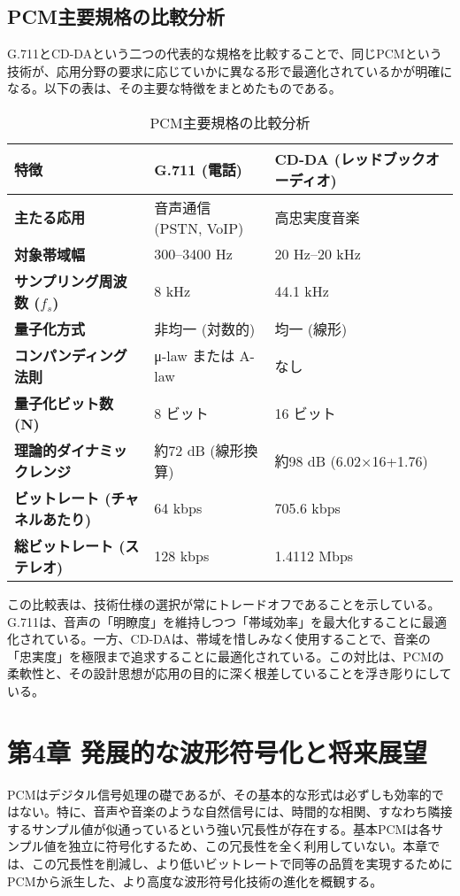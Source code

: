 \documentclass[
  a4paper,  %
  11pt,     %
]{ltjsarticle}%
\begin{document}
\subsection{PCM主要規格の比較分析}

G.711とCD-DAという二つの代表的な規格を比較することで、同じPCMという技術が、応用分野の要求に応じていかに異なる形で最適化されているかが明確になる。以下の表は、その主要な特徴をまとめたものである。

\begin{table}[H]
  \centering
  \caption{PCM主要規格の比較分析}
  \begin{tabular}{lll}
    \toprule
    \textbf{特徴} & \textbf{G.711 (電話)} & \textbf{CD-DA (レッドブックオーディオ)} \\
    \midrule
    \textbf{主たる応用} & 音声通信 (PSTN, VoIP) & 高忠実度音楽 \\
    \textbf{対象帯域幅} & 300–3400 Hz & 20 Hz–20 kHz \\
    \textbf{サンプリング周波数 ($f_s$)} & 8 kHz & 44.1 kHz \\
    \textbf{量子化方式} & 非均一 (対数的) & 均一 (線形) \\
    \textbf{コンパンディング法則} & μ-law または A-law & なし \\
    \textbf{量子化ビット数 (N)} & 8 ビット & 16 ビット \\
    \textbf{理論的ダイナミックレンジ} & 約72 dB (線形換算) & 約98 dB (6.02×16+1.76) \\
    \textbf{ビットレート (チャネルあたり)} & 64 kbps & 705.6 kbps \\
    \textbf{総ビットレート (ステレオ)} & 128 kbps & 1.4112 Mbps \\
    \bottomrule
  \end{tabular}
\end{table}

この比較表は、技術仕様の選択が常にトレードオフであることを示している。G.711は、音声の「明瞭度」を維持しつつ「帯域効率」を最大化することに最適化されている。一方、CD-DAは、帯域を惜しみなく使用することで、音楽の「忠実度」を極限まで追求することに最適化されている。この対比は、PCMの柔軟性と、その設計思想が応用の目的に深く根差していることを浮き彫りにしている。

\section{第4章 発展的な波形符号化と将来展望}

PCMはデジタル信号処理の礎であるが、その基本的な形式は必ずしも効率的ではない。特に、音声や音楽のような自然信号には、時間的な相関、すなわち隣接するサンプル値が似通っているという強い冗長性が存在する\cite{ref22}。基本PCMは各サンプル値を独立に符号化するため、この冗長性を全く利用していない。本章では、この冗長性を削減し、より低いビットレートで同等の品質を実現するためにPCMから派生した、より高度な波形符号化技術の進化を概観する。
\end{document}
